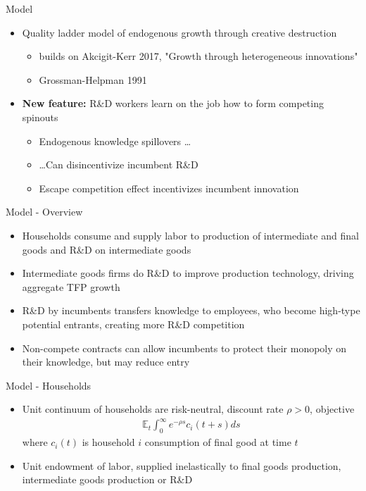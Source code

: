 \documentclass[english,usenames,dvipsnames]{beamer}
\begin{document}
\begin{frame}{Model}
\begin{itemize}	
	\item Quality ladder model of endogenous growth through creative destruction 
	\begin{itemize}
		\item builds on Akcigit-Kerr 2017, "Growth through heterogeneous innovations"
		\item Grossman-Helpman 1991
	\end{itemize}
	\item \textbf{New feature:} R\&D workers \alert{learn on the job} how to form \alert{competing spinouts}
	\begin{itemize}
		\item \alert{Endogenous knowledge spillovers} \ldots
		\item \ldots Can \alert{disincentivize incumbent R\&D}
		\item \alert{Escape competition effect} incentivizes incumbent innovation 
	\end{itemize} 
\end{itemize}
\end{frame}

\begin{frame}{Model - Overview}
\begin{itemize}
	\item Households consume and supply labor to production of intermediate and final goods and R\&D on intermediate goods
	\item Intermediate goods firms do R\&D to improve production technology, driving aggregate TFP growth
	\item R\&D by incumbents transfers knowledge to employees, who become high-type potential entrants, creating more R\&D competition
	\item Non-compete contracts can allow incumbents to protect their monopoly on their knowledge, but may reduce entry
\end{itemize}
\end{frame}

\begin{frame}{Model - Households}
\begin{itemize}
	\item Unit continuum of households are risk-neutral, discount rate $\rho > 0$, objective
	\begin{align*}
	\mathbb{E}_t \int_0^{\infty} e^{-\rho s} c_i(t+s) ds
	\end{align*}
	where $c_i(t)$ is household $i$ consumption of final good at time $t$
	\item Unit endowment of labor, supplied inelastically to final goods production, intermediate goods production or R\&D
\end{itemize}
\end{frame}
\end{document}
